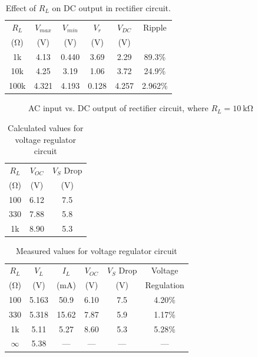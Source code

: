 \documentclass{article}
\begin{document}
\begin{table}[hbtp]
  \centering
  \begin{tabular}{cccccc}
    $R_L$ & $V_{max}$ & $V_{min}$ & $V_r$ & $V_{DC}$ & Ripple \\
    (\si{\ohm}) & (\si{V}) & (\si{V}) & (\si{V}) & (\si{V}) & \\
    \hline
    1k & 4.13 & 0.440 & 3.69 & 2.29 & 89.3\% \\
    10k & 4.25 & 3.19 & 1.06 & 3.72 & 24.9\% \\
    100k & 4.321 & 4.193 & 0.128 & 4.257 & 2.962\% \\
  \end{tabular}
  \caption{\label{tab:load_v_ripple} Effect of $R_L$ on DC output in rectifier circuit.}
\end{table}

\begin{figure}[hbtp]
  \centering
  
  \caption{\label{fig:rect_vp_vdc} AC input vs. DC output of rectifier circuit, where $R_L=\SI{10}{\kilo\ohm}$}
\end{figure}

\begin{table}
  \centering
  \begin{tabular}{ccc}
    $R_L$ & $V_{OC}$ & $V_S$ Drop \\
    (\si{\ohm})  & (\si{V}) & (\si{V}) \\
    \hline
    100 & 6.12 & 7.5 \\
    330 & 7.88 & 5.8 \\
    1k & 8.90 & 5.3 \\
  \end{tabular}
  \caption{\label{tab:volt_reg_calc} Calculated values for voltage regulator circuit}
\end{table}

\begin{table}
  \centering
  \begin{tabular}{cccccc}
    $R_L$ & $V_L$ & $I_L$ & $V_{OC}$ & $V_S$ Drop & Voltage \\
    (\si{\ohm}) & (\si{V}) & (\si{mA}) & (\si{V}) & (\si{V}) & Regulation \\
    \hline
    100 & 5.163 & 50.9 & 6.10 & 7.5 & 4.20\%  \\
    330 & 5.318 & 15.62 & 7.87 & 5.9 & 1.17\% \\
    1k & 5.11 & 5.27 & 8.60 & 5.3 & 5.28\% \\
    $\infty$ & 5.38 & --- & --- & --- & ---\\
  \end{tabular}
  \caption{\label{tab:volt_reg_meas} Measured values for voltage regulator circuit}
\end{table}
\end{document}
